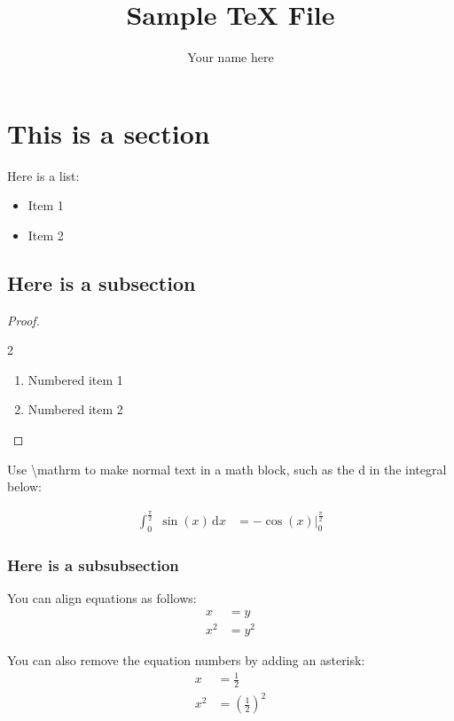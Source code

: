\documentclass[12pt]{article}
\newcommand{\parens}[1]{\left(#1\right)}
\newcommand{\gap}{\vspace{3mm}}
\begin{document}
\title{Sample TeX File}
\author{Your name here}
\date{}

\maketitle

\tableofcontents{}
\pagebreak

\section{This is a section}
Here is a list:
\begin{itemize}[noitemsep, topsep=0pt, label=-]
\item Item 1
\item Item 2
\end{itemize}

\gap

\subsection{Here is a subsection}
\begin{proof} \quad %
\begin{spreadlines}{2\baselineskip}
\begin{enumerate}[label=(\alph*)]
\item Numbered item 1
\item Numbered item 2
\end{enumerate}
\end{spreadlines}
\end{proof}

Use \textbackslash{}mathrm to make normal text in a math block, such as the d in the integral below:

\begin{align*}
\int_{0}^{\frac{\pi}{2}} \; \sin(x) \, \mathrm{d}x &= -\cos(x) \Big|_0^\frac{\pi}{2}
\end{align*}

\gap

\subsubsection{Here is a subsubsection}
You can align equations as follows:
\begin{align}
x&=y\\
x^2&=y^2
\end{align}

You can also remove the equation numbers by adding an asterisk:
\begin{align*}
x&=\frac{1}{2}\\
x^2&=\parens{\frac{1}{2}}^2
\end{align*}
\end{document}
